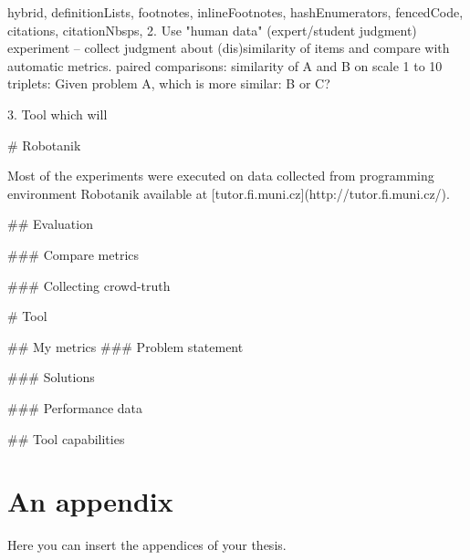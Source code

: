 \documentclass[
  digital, %
  table,   %
  lof,     %
  lot,     %
]{fithesis3}
\begin{document}
\begin{markdown*}{%
  hybrid,
  definitionLists,
  footnotes,
  inlineFootnotes,
  hashEnumerators,
  fencedCode,
  citations,
  citationNbsps,
}
2. Use "human data" (expert/student judgment) experiment -- collect judgment about (dis)similarity of items and compare with automatic metrics.
paired comparisons: similarity of A and B on scale 1 to 10
triplets: Given problem A, which is more similar: B or C?

3. Tool which will


%
%

# Robotanik

Most of the experiments were executed on data collected from programming environment Robotanik available at [tutor.fi.muni.cz](http://tutor.fi.muni.cz/).

## Evaluation

### Compare metrics

### Collecting crowd-truth


%
%

# Tool

## My metrics
### Problem statement

### Solutions

### Performance data

## Tool capabilities

\end{markdown*}

  \makeatletter\thesis@blocks@clear\makeatother
  \printindex

\appendix %
\chapter{An appendix}
Here you can insert the appendices of your thesis.
\end{document}
